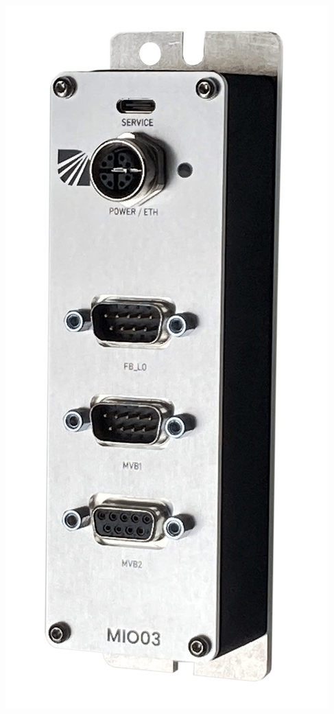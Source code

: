 \begin{minipage}{0.4\textwidth}
  \includegraphics[width=0.7\linewidth]{Figures/Chap3/Konkurenz/CI4Rail.png}
  \label{fig:Ci4RailSniffer}
\end{minipage}
\vspace{0.3cm}
\hfill
